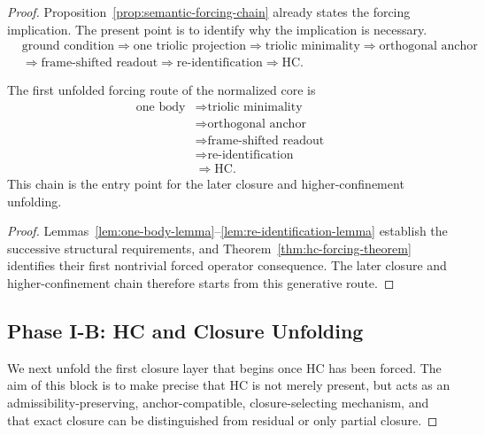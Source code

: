 \begin{proof}
Proposition~\ref{prop:semantic-forcing-chain} already states the forcing
implication. The present point is to identify why the implication is necessary.
\[
\begin{aligned}
&\text{ground condition}
\Longrightarrow
\text{one triolic projection}
\Longrightarrow
\text{triolic minimality}
\Longrightarrow
\text{orthogonal anchor}
\\[0.2em]
&\Longrightarrow
\text{frame-shifted readout}
\Longrightarrow
\text{re-identification}
\Longrightarrow
\mathrm{HC}.
\end{aligned}
\]

\begin{corollary}
\label{cor:first-generative-forcing-chain}
The first unfolded forcing route of the normalized core is
\[
\begin{aligned}
\text{one body}
&\Longrightarrow \text{triolic minimality}\\
&\Longrightarrow \text{orthogonal anchor}\\
&\Longrightarrow \text{frame-shifted readout}\\
&\Longrightarrow \text{re-identification}\\
&\Longrightarrow \mathrm{HC}.
\end{aligned}
\]
This chain is the entry point for the later closure and higher-confinement
unfolding.
\end{corollary}

\begin{proof}
Lemmas~\ref{lem:one-body-lemma}--\ref{lem:re-identification-lemma} establish the
successive structural requirements, and
Theorem~\ref{thm:hc-forcing-theorem} identifies their first nontrivial forced
operator consequence. The later closure and higher-confinement chain therefore
starts from this generative route.
\end{proof}


\subsection*{Phase I-B: HC and Closure Unfolding}

We next unfold the first closure layer that begins once HC has been forced.
The aim of this block is to make precise that HC is not merely present, but
acts as an admissibility-preserving, anchor-compatible, closure-selecting
mechanism, and that exact closure can be distinguished from residual or only
partial closure.


\end{proof}
